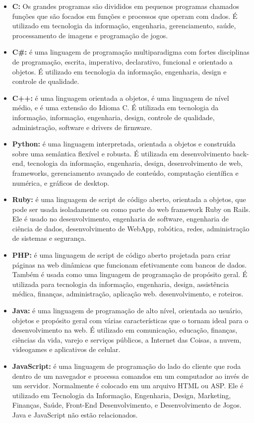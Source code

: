 \documentclass[11pt, letterpaper, portuguese]{article}
\begin{document}
      \begin{itemize} 
      \item{ \textbf{C:} Os grandes programas são divididos em pequenos programas chamados funções que são focados em funções e processos que operam com dados. É utilizado em tecnologia da informação, engenharia, gerenciamento, saúde, processamento de imagens e programação de jogos. } 
      \item{\textbf{C\#:} é uma linguagem de programação multiparadigma com fortes disciplinas de programação, escrita, imperativo, declarativo, funcional e orientado a objetos. É utilizado em tecnologia da informação, engenharia, design e controle de qualidade.} 
      \item{\textbf{C++:} é uma linguagem orientada a objetos, é uma linguagem de nível médio, e é uma extensão do Idioma C. É utilizada em tecnologia da informação, informação, engenharia, design, controle de qualidade, administração, software e drivers de firmware. } 
      \item{\textbf{Python:} é uma linguagem interpretada, orientada a objetos e construída sobre uma semântica flexível e robusta. É utilizada em desenvolvimento back-end, tecnologia da informação, engenharia, design, desenvolvimento de web, frameworks, gerenciamento avançado de conteúdo, computação científica e numérica, e gráficos de desktop.} 
      \item{\textbf{Ruby:} é uma linguagem de script de código aberto, orientada a objetos, que pode ser usada isoladamente ou como parte do web framework Ruby on Rails. Ele é usado no desenvolvimento, engenharia de software, engenharia de ciência de dados, desenvolvimento de WebApp, robótica, redes, administração de sistemas e segurança.} 
      \item{\textbf{PHP:}  é uma linguagem de script de código aberto projetada para criar páginas na web dinâmicas que funcionam efetivamente com bancos de dados. Também é usada como uma linguagem de programação de propósito geral. É utilizada para tecnologia da informação, engenharia, design, assistência médica, finanças, administração, aplicação web. desenvolvimento, e roteiros.} 
      \item{\textbf{Java:} é uma linguagem de programação de alto nível, orientada ao usuário, objetos e propósito geral com várias características que o tornam ideal para o desenvolvimento na web. É utilizado em comunicação, educação, finanças, ciências da vida, varejo e serviços públicos, a Internet das Coisas, a nuvem, videogames e aplicativos de celular.}
      \item{\textbf{JavaScript:} é uma linguagem de programação do lado do cliente que roda dentro de um navegador e processa comandos em um computador ao invés de um servidor. Normalmente é colocado em um arquivo HTML ou ASP. Ele é utilizado em Tecnologia da Informação, Engenharia, Design, Marketing, Finanças, Saúde, Front-End Desenvolvimento, e Desenvolvimento de Jogos. Java e JavaScript não estão relacionados.} 
      \end{itemize} 
\end{document}
